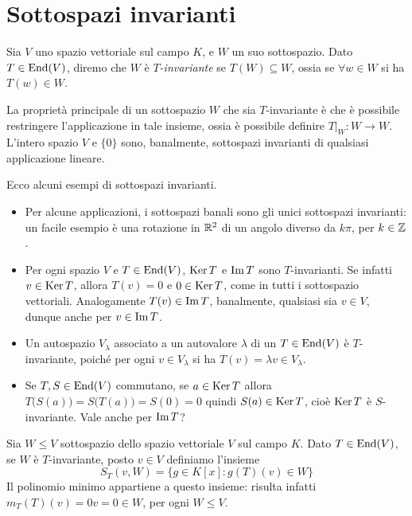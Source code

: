 \section{Sottospazi invarianti} \label{sec:sottospazi-invarianti}
\begin{definizione}\label{d:sottospazio-invariante}
	Sia $V$ uno spazio vettoriale sul campo $K$, e $W$ un suo sottospazio.
	Dato $T\in\operatorname{End}(V)$, diremo che $W$ è \emph{$T$-invariante} se $T(W)\subseteq W$, ossia se $\forall w\in W$ si ha $T(w)\in W$.
\end{definizione}
La proprietà principale di un sottospazio $W$ che sia $T$-invariante è che è possibile restringere l'applicazione in tale insieme, ossia è possibile definire $T|_W\colon W\to W$.
L'intero spazio $V$ e $\{0\}$ sono, banalmente, sottospazi invarianti di qualsiasi applicazione lineare.

Ecco alcuni esempi di sottospazi invarianti.
\begin{itemize}
	\item Per alcune applicazioni, i sottospazi banali sono gli unici sottospazi invarianti: un facile esempio è una rotazione in $\mathbb{R}^2$ di un angolo diverso da $k\pi$, per $k\in\mathbb{Z}$.
	\item Per ogni spazio $V$ e $T\in\operatorname{End}(V)$, $\operatorname{Ker} T$ e $\operatorname{Im} T$ sono $T$-invarianti.
		Se infatti $v\in\operatorname{Ker} T$, allora $T(v)=0$ e $0\in\operatorname{Ker} T$, come in tutti i sottospazio vettoriali.
		Analogamente $T(v)\in\operatorname{Im} T$, banalmente, qualsiasi sia $v\in V$, dunque anche per $v\in\operatorname{Im} T$.
	\item Un autospazio $V_\lambda$ associato a un autovalore $\lambda$ di un $T\in\operatorname{End}(V)$ è $T$-invariante, poich\'e per ogni $v\in V_\lambda$ si ha $T(v)=\lambda v\in V_\lambda$.
	\item Se $T,S\in\operatorname{End}(V)$ commutano, se $a\in\operatorname{Ker} T$ allora $T\big(S(a)\big)=S\big(T(a)\big)=S(0)=0$ quindi $S(a)\in\operatorname{Ker} T$, cioè $\operatorname{Ker} T$ è $S$-invariante.
		Vale anche per $\operatorname{Im} T$?
\end{itemize}

Sia $W \leq V$ sottospazio dello spazio vettoriale $V$ sul campo $K$.
Dato $T\in\operatorname{End}(V)$, se $W$ è $T$-invariante, posto $v\in V$ definiamo l'insieme
\begin{equation*}
	S_T(v, W)= \{ g\in K[x]\colon g(T)(v)\in W\}
\end{equation*}
Il polinomio minimo appartiene a questo insieme: risulta infatti $m_T(T)(v)=0v=0\in W$, per ogni $W\le V$.

